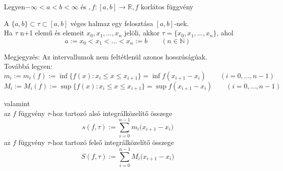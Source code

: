 \documentclass[12pt,margin=0px]{article}
\newcommand{\R}{\mathbb{R}}
\begin{document}
    \noindent Legyen$ -\infty < a < b < \infty$ és $, f:[a,b] \rightarrow \R, f $ korlátos függvény

    \noindent A $ \{a,b\} \subset \tau \subset [a,b]$ véges halmaz egy felosztása $[a,b]$-nek. \\

    \noindent Ha $\tau$ n+1 elemű és elemeit $x_0, x_1, \ldots, x_n$ jelöli, akkor $\tau = \Big\{x_0, x_1, \ldots, x_n \Big\} $, ahol
    \[
        a := x_0 < x_1 < \ldots < x_n := b \qquad (n \in \mathbb{N})
    \]

    \noindent Megjegyzés: Az intervallumok nem feltétlenül azonos hosszúságúak.\\

    \noindent Továbbá legyen:\\
	\[
        m_i := m_i(f) := \inf\Big\{f(x): x_i \leq x \leq x_{i+1} \Big\} = \inf f(x_{i+1} - x_i) \qquad (i = 0,\ldots,n-1)
    \]
	\[
        M_i := M_i(f) := \sup\Big\{f(x): x_i \leq x \leq x_{i+1} \Big\} = \sup f(x_{i+1} - x_i) \qquad (i = 0,\ldots,n-1)
    \]
					
    \noindent valamint\\
    \noindent az $f$ függvény $\tau$-hoz tartozó alsó integrálközelítő összege\\
    \[
        s(f, \tau) := \sum\limits_{i=0}^{n-1} m_i\big(x_{i+1} - x_i\big)
    \]
    \noindent az $f$ függvény $\tau$-hoz tartozó felső integrálközelítő összege
    \[
        S(f, \tau) := \sum\limits_{i=0}^{n-1} M_i\big(x_{i+1} - x_i\big)
    \]
					
\end{document}
